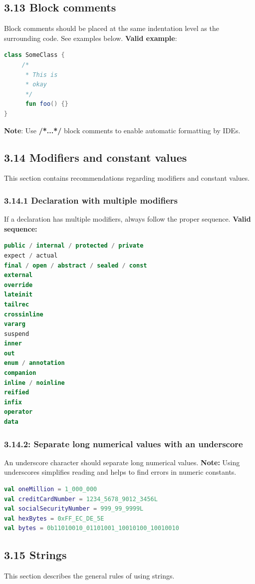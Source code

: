\subsection*{\textbf{3.13 Block comments}}
\label{sec:3.13}
Block comments should be placed at the same indentation level as the surrounding code. See examples below.
\textbf{Valid example}:
\begin{lstlisting}[language=Kotlin]
class SomeClass {
     /*
      * This is
      * okay
      */
      fun foo() {}
}
\end{lstlisting}
\textbf{Note}: Use \textbf{/*...*/} block comments to enable automatic formatting by IDEs.
\subsection*{\textbf{3.14 Modifiers and constant values}}
\label{sec:3.14}
This section contains recommendations regarding modifiers and constant values.
\subsubsection*{\textbf{3.14.1 Declaration with multiple modifiers}}
\leavevmode\newline
\label{sec:3.14.1}
If a declaration has multiple modifiers, always follow the proper sequence.
\textbf{Valid sequence:}
\begin{lstlisting}[language=Kotlin]
public / internal / protected / private
expect / actual
final / open / abstract / sealed / const
external
override
lateinit
tailrec
crossinline
vararg
suspend
inner
out
enum / annotation
companion
inline / noinline
reified
infix
operator
data
\end{lstlisting}
\subsubsection*{\textbf{3.14.2: Separate long numerical values with an underscore}}
\leavevmode\newline
\label{sec:3.14.2}
An underscore character should separate long numerical values.
\textbf{Note:} Using underscores simplifies reading and helps to find errors in numeric constants.
\begin{lstlisting}[language=Kotlin]
val oneMillion = 1_000_000
val creditCardNumber = 1234_5678_9012_3456L
val socialSecurityNumber = 999_99_9999L
val hexBytes = 0xFF_EC_DE_5E
val bytes = 0b11010010_01101001_10010100_10010010
\end{lstlisting}
\subsection*{\textbf{3.15 Strings}}
\label{sec:3.15}
This section describes the general rules of using strings.
